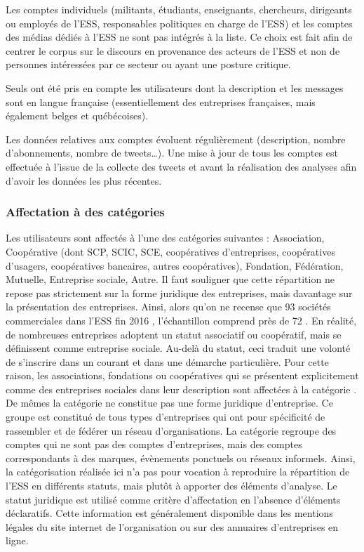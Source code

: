 Les comptes individuels (militants, étudiants, enseignants, chercheurs, dirigeants ou employés de l’ESS, responsables politiques en charge de l’ESS) et les comptes des médias dédiés à l’ESS ne sont pas intégrés à la liste. Ce choix est fait afin de centrer le corpus sur le discours en provenance des acteurs de l’ESS et non de personnes intéressées par ce secteur ou ayant une posture critique.

Seuls ont été pris en compte les utilisateurs dont la description et les messages sont en langue française (essentiellement des entreprises françaises, mais également belges et québécoises).

Les données relatives aux comptes évoluent régulièrement (description, nombre d’abonnements, nombre de tweets…). Une mise à jour de tous les comptes est effectuée à l’issue de la collecte des tweets et avant la réalisation des analyses afin d’avoir les données les plus récentes.

\subsubsection{Affectation à des catégories}

Les utilisateurs sont affectés à l’une des catégories suivantes : Association, Coopérative (dont SCP, SCIC, SCE, coopératives d’entreprises, coopératives d’usagers, coopératives bancaires, autres coopératives), Fondation, Fédération, Mutuelle, Entreprise sociale, Autre. Il faut souligner que cette répartition ne repose pas strictement sur la forme juridique des entreprises, mais davantage sur la présentation des entreprises. Ainsi, alors qu’on ne recense que 93 sociétés commerciales dans l’ESS fin 2016 \parencite{observatoire_national_de_leconomie_sociale_et_solidaire_france2017atlas}, l’échantillon comprend près de 72 . En réalité, de nombreuses entreprises adoptent un statut associatif ou coopératif, mais se définissent comme entreprise sociale. Au-delà du statut, ceci traduit une volonté de s’inscrire dans un courant et dans une démarche particulière. Pour cette raison, les associations, fondations ou coopératives qui se présentent explicitement comme des entreprises sociales dans leur description sont affectées à la catégorie . De mêmes la catégorie  ne constitue pas une forme juridique d’entreprise. Ce groupe est constitué de tous types d’entreprises qui ont pour spécificité de rassembler et de fédérer un réseau d’organisations. La catégorie  regroupe des comptes qui ne sont pas des comptes d’entreprises, mais des comptes correspondants à des marques, évènements ponctuels ou réseaux informels. Ainsi, la catégorisation réalisée ici n’a pas pour vocation à reproduire la répartition de l’ESS en différents statuts, mais plutôt à apporter des éléments d’analyse. Le statut juridique est utilisé comme critère d’affectation en l’absence d’éléments déclaratifs. Cette information est généralement disponible dans les mentions légales du site internet de l’organisation ou sur des annuaires d’entreprises en ligne.

